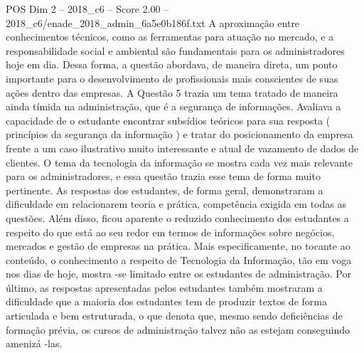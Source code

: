 \begin{textsample}{POS Dim 2 – 2018\_c6 – Score 2.00 – 2018\_c6/enade\_2018\_admin\_6a5e0b186f.txt}
A aproximação entre conhecimentos técnicos, como as ferramentas para atuação no mercado, e a responsabilidade social e ambiental são fundamentais para os administradores hoje em dia.
Dessa forma, a questão abordava, de maneira direta, um ponto importante para o desenvolvimento de profissionais mais conscientes de suas ações dentro das empresas.
A Questão 5 trazia um tema tratado de maneira ainda tímida na administração, que é a segurança de informações.
Avaliava a capacidade de o estudante encontrar subsídios teóricos para sua resposta ( princípios da segurança da informação ) e tratar do posicionamento da empresa frente a um caso ilustrativo muito interessante e atual de vazamento de dados de clientes.
O tema da tecnologia da informação se mostra cada vez mais relevante para os administradores, e essa questão trazia esse tema de forma muito pertinente.
As respostas dos estudantes, de forma geral, demonstraram a dificuldade em relacionarem teoria e prática, competência exigida em todas as questões.
Além disso, ficou aparente o reduzido conhecimento dos estudantes a respeito do que está ao seu redor em termos de informações sobre negócios, mercados e gestão de empresas na prática.
Mais especificamente, no tocante ao conteúdo, o conhecimento a respeito de Tecnologia da Informação, tão em voga nos dias de hoje, mostra -se limitado entre os estudantes de administração.
Por último, as respostas apresentadas pelos estudantes também mostraram a dificuldade que a maioria dos estudantes tem de produzir textos de forma articulada e bem estruturada, o que denota que, mesmo sendo deficiências de formação prévia, os cursos de administração talvez não as estejam conseguindo amenizá -las.

\end{textsample}
